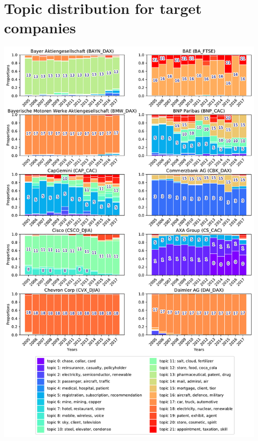 \documentclass[12pt,journal,letterpaper,oneside,onecolumn]{IEEEtran}
\begin{document}
\section{Topic distribution for target companies}
\begin{center}
\includegraphics[width=0.85\linewidth]{images/companies_on_page_1.pdf}
\end{center}
\end{document}
